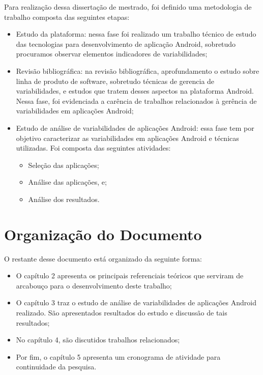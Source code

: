 Para realização dessa dissertação de mestrado, foi definido uma metodologia de trabalho
composta das seguintes etapas:
\begin{itemize}
    \item Estudo da plataforma: nessa fase foi realizado um trabalho técnico de
          estudo das tecnologias para desenvolvimento de aplicação Android, sobretudo
          procuramos observar elementos indicadores de variabilidades;
    \item Revisão bibliográfica: na revisão bibliográfica, aprofundamento o estudo
          sobre linha de produto de software, sobretudo técnicas de gerencia de
          variabilidades, e estudos que tratem desses aspectos na plataforma Android.
          Nessa fase, foi evidenciada a carência de trabalhos relacionados à gerência
          de variabilidades em aplicações Android;
    \item Estudo de análise de variabilidades de aplicações Android: essa fase tem
          por objetivo caracterizar as variabilidades em aplicações Android e
          técnicas utilizadas. Foi composta das seguintes atividades:
         \begin{itemize}
            \item Seleção das aplicações;
            \item Análise das aplicações, e;
            \item Análise dos resultados.
         \end{itemize}
\end{itemize}


\section{Organização do Documento}
O restante desse documento está organizado da seguinte forma:
\begin{itemize}
    \item O capítulo 2 apresenta os principais referenciais teóricos que serviram
            de arcabouço para o desenvolvimento deste trabalho;
    \item O capítulo 3 traz o estudo de análise de variabilidades de aplicações
          Android realizado. São apresentados resultados do estudo e discussão de tais resultados;
    \item No capítulo 4, são discutidos trabalhos relacionados;
    \item Por fim, o capítulo 5 apresenta um cronograma de atividade para continuidade da pesquisa.
\end{itemize}
